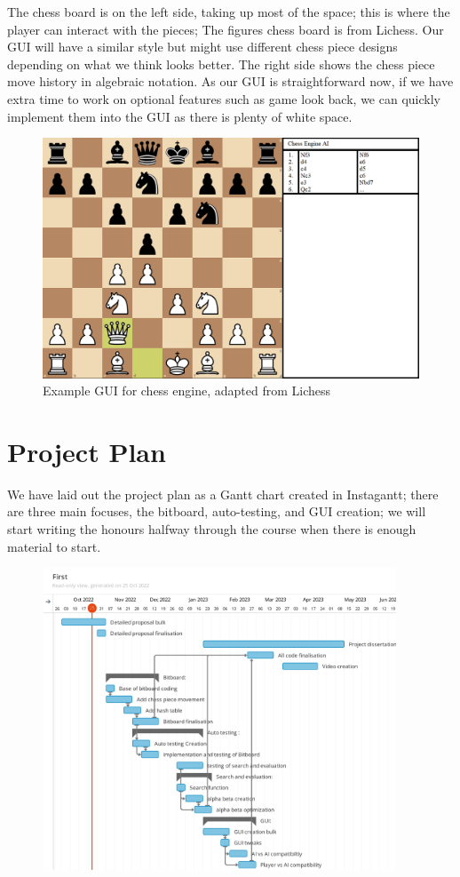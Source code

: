 \documentclass{article}
\begin{document}
The chess board is on the left side, taking up most of the space; this is where the player can interact with the pieces; The figures chess board is from Lichess\cite{lichess}. Our GUI will have a similar style but might use different chess piece designs depending on what we think looks better. The right side shows the chess piece move history in algebraic notation\cite{wiki:algebra}. As our GUI is straightforward now, if we have extra time to work on optional features such as game look back, we can quickly implement them into the GUI as there is plenty of white space.
\begin{figure}[!htb]
    \centering
    \includegraphics[width=1\textwidth]{GUI}
    \caption{Example GUI for chess engine, adapted from Lichess\cite{lichess}}
    \label{fig:gui}
\end{figure}

\newpage
\section{Project Plan} \label{plan} %
We have laid out the project plan as a Gantt chart created in Instagantt\cite{gantt}; there are three main focuses, the bitboard, auto-testing, and GUI creation; we will start writing the honours halfway through the course when there is enough material to start.

\includegraphics[height=90mm,width=0.95\textwidth]{ProjectPlan}
\end{document}
